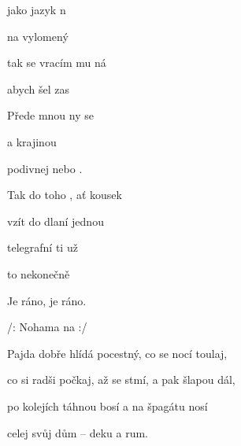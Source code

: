 



\zs
{} jako jazyk  n

na vylomený 

tak se vracím mu ná

abych šel zas 

{Přede} mnou ny se 

a  krajinou 

podivnej   nebo .
\ks

\zr
Tak do toho , ať  kousek 

vzít do dlaní   jednou 

telegrafní   ti už 

to nekonečně   

Je ráno, je ráno.

/: Nohama   na  :/
\kr

\zs
Pajda dobře hlídá pocestný, co se nocí toulaj,

co si radši počkaj, až se stmí, a pak šlapou dál,

po kolejích táhnou bosí a na špagátu nosí

celej svůj dům -- deku a rum.
\ks

\zr  \kr

\kp

